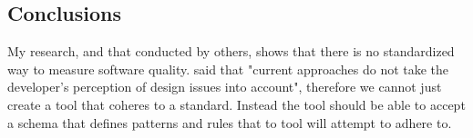 \subsection{Conclusions}
My research, and that conducted by others, shows that there is no standardized way to measure software quality. \cite{10.1145/3428029.3428047, 10.1145/2674683.2674702} said that "current approaches do not take the developer's perception of design issues into account", therefore we cannot just create a tool that coheres to a standard. Instead the tool should be able to accept a schema that defines patterns and rules that to tool will attempt to adhere to.
